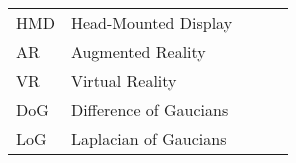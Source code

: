 \begin{table}[h]
\begin{tabular}{|l|l|lll}
\cline{1-2}
HMD & Head-Mounted Display   &  &  &  \\ \cline{1-2}
AR  & Augmented Reality      &  &  &  \\ \cline{1-2}
VR  & Virtual Reality      &  &  &  \\ \cline{1-2}
DoG & Difference of Gaucians &  &  &  \\ \cline{1-2}
LoG & Laplacian of Gaucians  &  &  &  \\ \cline{1-2}
\end{tabular}
\end{table}